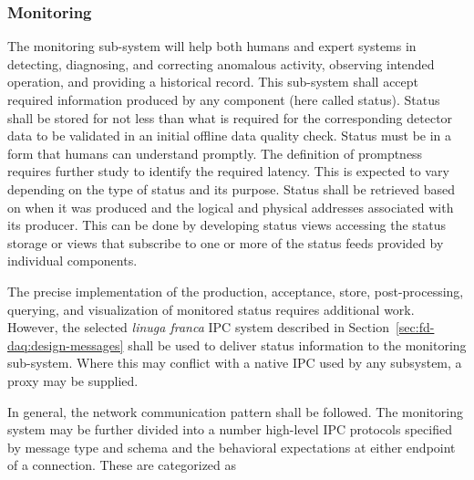 \subsubsection{Monitoring}
\label{sec:daq:design:ccm:monitoring}

The  monitoring sub-system will help both humans and expert systems in detecting, diagnosing, and correcting anomalous activity, observing intended operation, and providing a historical record.
This sub-system shall accept required information produced by any  component (here called status).
Status shall be stored for not less than what is required for the corresponding detector data to be validated in an initial offline data quality check.
Status must be in a form that humans can understand promptly. 
The definition of promptness requires further study to identify the required latency. This is expected to vary depending on the type of status and its purpose.  
Status shall be retrieved based on when it was produced and the logical and physical addresses associated with its producer.
This can be done by developing status views accessing the status storage or views that subscribe to one or more of the status feeds provided by individual components.

The precise implementation of the production, acceptance, store, post-processing, querying, and visualization of monitored status requires additional work. 
However, the selected \textit{linuga franca} IPC system described in Section~\ref{sec:fd-daq:design-messages} shall be used to deliver status information to the monitoring sub-system. 
Where this may conflict with a native IPC used by any subsystem, a proxy may be supplied. 

In general, the  network communication pattern shall be followed. 
The monitoring system may be further divided into a number high-level IPC protocols specified by message type and schema and the behavioral expectations at either endpoint of a connection.
These are categorized as


